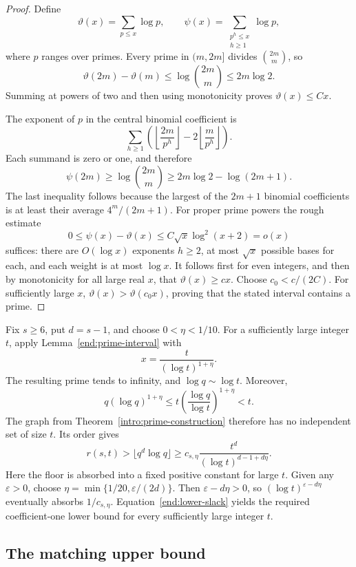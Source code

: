 \begin{proof}
Define
\[
 \vartheta(x)=\sum_{p\le x}\log p,
 \qquad
 \psi(x)=\sum_{\substack{p^h\le x\\h\ge1}}\log p,
\]
where $p$ ranges over primes. Every prime in $(m,2m]$ divides
$\binom{2m}{m}$, so
\[
 \vartheta(2m)-\vartheta(m)
 \le\log\binom{2m}{m}\le2m\log2.
\]
Summing at powers of two and then using monotonicity proves
$\vartheta(x)\le Cx$.

The exponent of $p$ in the central binomial coefficient is
\[
 \sum_{h\ge1}
 \left(\left\lfloor\frac{2m}{p^h}\right\rfloor
        -2\left\lfloor\frac{m}{p^h}\right\rfloor\right).
\]
Each summand is zero or one, and therefore
\[
 \psi(2m)\ge\log\binom{2m}{m}
 \ge2m\log2-\log(2m+1).
\]
The last inequality follows because the largest of the $2m+1$
binomial coefficients is at least their average $4^m/(2m+1)$.
For proper prime powers the rough estimate
\[
 0\le\psi(x)-\vartheta(x)
   \le C\sqrt{x}\log^2(x+2)=o(x)
\]
suffices: there are $O(\log x)$ exponents $h\ge2$, at most
$\sqrt{x}$ possible bases for each, and each weight is at most
$\log x$. It follows first for even integers, and then by monotonicity
for all large real $x$, that $\vartheta(x)\ge cx$.
Choose $c_0<c/(2C)$. For sufficiently large $x$,
$\vartheta(x)>\vartheta(c_0x)$, proving that the stated interval
contains a prime.
\end{proof}

Fix $s\ge6$, put $d=s-1$, and choose $0<\eta<1/10$.
For a sufficiently large integer $t$, apply
Lemma~\ref{end:prime-interval} with
\[
 x=\frac{t}{(\log t)^{1+\eta}}.
\]
The resulting prime tends to infinity, and $\log q\sim\log t$.
Moreover,
\[
 q(\log q)^{1+\eta}
 \le t\left(\frac{\log q}{\log t}\right)^{1+\eta}<t.
\]
The graph from Theorem~\ref{intro:prime-construction} therefore has no
independent set of size $t$. Its order gives
\begin{equation}
 r(s,t)>\lfloor q^d\log q\rfloor
 \ge c_{s,\eta}\frac{t^d}{(\log t)^{d-1+d\eta}}.
 \label{end:lower-slack}
\end{equation}
Here the floor is absorbed into a fixed positive constant for large
$t$. Given any $\varepsilon>0$, choose
$\eta=\min\{1/20,\varepsilon/(2d)\}$. Then
$\varepsilon-d\eta>0$, so
$(\log t)^{\varepsilon-d\eta}$ eventually absorbs
$1/c_{s,\eta}$. Equation~\eqref{end:lower-slack} yields the required
coefficient-one lower bound for every sufficiently large integer $t$.

\subsection{The matching upper bound}

